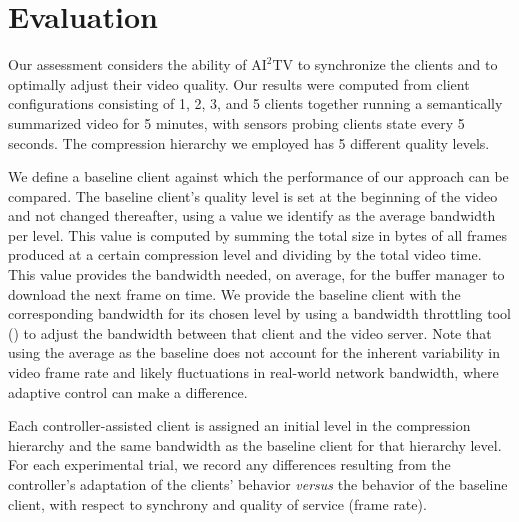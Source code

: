 \documentclass{sig-alternate}
\begin{document}
\section{Evaluation} \label{eval}

Our assessment considers the ability of $\mathrm{AI}^2$TV to
synchronize the clients and to optimally adjust their video quality.
Our results were computed from client configurations consisting of 1,
2, 3, and 5 clients together running a semantically summarized video
for 5 minutes, with sensors probing clients state every 5 seconds. The
compression hierarchy we employed has 5 different quality levels.

We define a baseline client against which the performance of our
approach can be compared.  The baseline client's quality level is set
at the beginning of the video and not changed thereafter, using a
value we identify as the average bandwidth per level. This value is
computed by summing the total size in bytes of all frames produced at
a certain compression level and dividing by the total video time.
This value provides the bandwidth needed, on average, for the buffer
manager to download the next frame on time.  We provide the baseline
client with the corresponding bandwidth for its chosen level by using
a bandwidth throttling tool (\cite{SHAPERD}) to adjust the bandwidth
between that client and the video server.  Note that using the average
as the baseline does not account for the inherent variability in video
frame rate and likely fluctuations in real-world network bandwidth,
where adaptive control can make a difference.

Each controller-assisted client is assigned an initial level in the
compression hierarchy and the same bandwidth as the baseline client
for that hierarchy level.  For each experimental trial, we record any
differences resulting from the controller's adaptation of the clients'
behavior {\it versus} the behavior of the baseline client, with
respect to synchrony and quality of service (frame rate).

 
\end{document}

